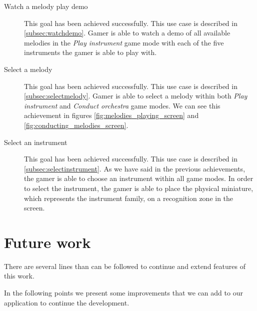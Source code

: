 \begin{description}
\item[Watch a melody play demo]
This goal has been achieved successfully. This use case is described in \ref{subsec:watchdemo}. Gamer is able to watch a demo of all available melodies in the \textit{Play instrument} game mode with each of the five instruments the gamer is able to play with.

\item[Select a melody]
This goal has been achieved successfully. This use case is described in \ref{subsec:selectmelody}. Gamer is able to select a melody within both \textit{Play instrument} and \textit{Conduct orchestra} game modes.  We can see this achievement in figures \ref{fig:melodies_playing_screen} and \ref{fig:conducting_melodies_screen}.

\item[Select an instrument]
This goal has been achieved successfully. This use case is described in \ref{subsec:selectinstrument}. As we have said in the previous achievements, the gamer is able to choose an instrument within all game modes. In order to select the instrument, the gamer is able to place the physical miniature, which represents the instrument family, on a recognition zone in the screen.

\end{description}

\section{Future work}

There are several lines than can be followed to continue and extend features of this work.

In the following points we present some improvements that we can add to our application to continue the development.

